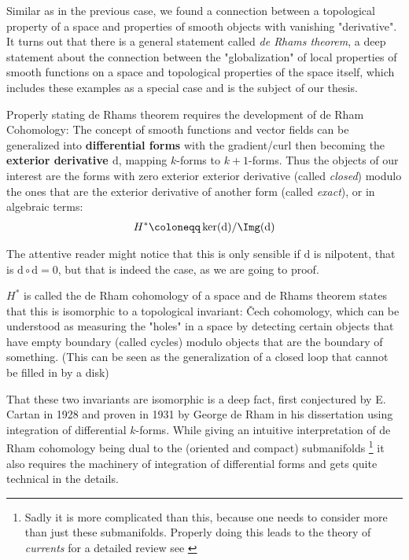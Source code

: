 Similar as in the previous case, we found a connection between a topological property of a space and properties of smooth
objects with vanishing "derivative". It turns out that there is a general statement called \textit{de Rhams theorem}, a deep
statement about the connection between the "globalization" of local properties of smooth functions on a space and topological
properties of the space itself, which includes these examples as a special case and is the subject of our thesis.

Properly stating de Rhams theorem requires the development of de Rham Cohomology: The concept of smooth
functions and vector fields can be generalized into \textbf{differential forms} with the gradient/curl then
becoming the \textbf{exterior derivative $\mathrm{d}$}, mapping $k$-forms to $k+1$-forms. Thus the objects
of our interest are the forms with zero exterior exterior derivative (called \textit{closed}) modulo the ones that are
the exterior derivative of another form (called \textit{exact}), or in algebraic terms:
\begin{align*}
	H^* \coloneqq \ker(\mathrm{d}) / \Img(\mathrm{d})
\end{align*}

\begin{remark}
The attentive reader might notice that this is only sensible if $\mathrm{d}$ is nilpotent, that
is $\mathrm{d} \circ \mathrm{d} = 0$, but that is indeed the case, as we are going to proof.
\end{remark}

$H^*$ is called the de Rham cohomology of a space and de Rhams theorem states that this is
isomorphic to a topological invariant: Čech cohomology, which can be understood as measuring the "holes"
in a space by detecting certain objects that have empty boundary (called cycles) modulo objects that are the
boundary of something. (This can be seen as the generalization of a closed loop that cannot be filled in by a disk)

That these two invariants are isomorphic is a deep fact, first conjectured by E. Cartan in 1928 and
proven in 1931 by George de Rham in his dissertation \cite{de_rham_sur_1931} using integration
of differential $k$-forms. While giving an intuitive interpretation of de Rham cohomology being dual to the
(oriented and compact) submanifolds
\footnote{
	Sadly it is more complicated than this, because one needs to consider more than just these submanifolds.
	Properly doing this leads to the theory of \textit{currents} for a detailed review see \cite{de_rham_differentiable_1984}
}
it also requires the machinery of integration of differential forms and gets quite technical in the details.

